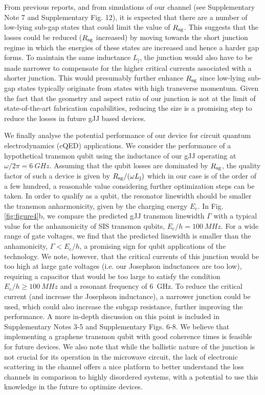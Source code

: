 \documentclass[preprint,
  onecolumn,
  notitlepage,
  amsmath,amssymb,
  aip,
  apl,
]{revtex4-1}
\begin{document}
From previous reports\cite{rosdahl_andreev_2018}, and from simulations of our channel (see Supplementary Note 7 and Supplementary Fig. 12), it is expected that there are a number of low-lying sub-gap states that could limit the value of $R_{\rm sg}$.
This suggests that the losses could be reduced ($R_{\rm sg}$ increased) by moving towards the short junction regime in which the energies of these states are increased and hence a harder gap forms.
To maintain the same inductance $L_\textrm{j}$, the junction would also have to be made narrower to compensate for the higher critical currents associated with a shorter junction.
This would presumably further enhance $R_{\rm sg}$ since low-lying sub-gap states typically originate from states with high transverse momentum.
Given the fact that the geometry and aspect ratio of our junction is not at the limit of state-of-the-art fabrication capabilities, reducing the size is a promising step to reduce the losses in future gJJ based devices.

We finally analyse the potential performance of our device for circuit quantum electrodynamics (cQED) applications.
We consider the performance of a hypothetical transmon qubit \cite{koch_chargeinsensitive_2007} using the inductance of our gJJ operating at $\omega/2\pi=\SI{6}{GHz}$.
Assuming that the qubit losses are dominated by $R_{\rm sg}$, the quality factor of such a device is given by $R_{\rm sg}/(\omega L_\textrm{j})$ which in our case is of the order of a few hundred, a reasonable value considering further optimization steps can be taken.
In order to qualify as a qubit, the resonator linewidth should be smaller the transmon anharmonicity, given by the charging energy $E_\textrm{c}$.
In Fig. \ref{fig:figure4}b, we compare the predicted gJJ transmon linewidth $\Gamma$ with a typical value for the anhamonicity of SIS transmon qubits, $E_\textrm{c}/h = \SI{100}{MHz}$.
For a wide range of gate voltages, we find that the predicted linewidth is smaller than the anhamonicity, $\Gamma < E_\textrm{c}/h$, a promising sign for qubit applications of the technology.
We note, however, that the critical currents of this junction would be too high at large gate voltages (i.e. our Josephson inductances are too low), requiring a capacitor that would be too large to satisfy the condition $E_\textrm{c}/h \geq \SI{100}{MHz}$ and a resonant frequency of \SI{6}{GHz}.
To reduce the critical current (and increase the Josephson inductance), a narrower junction could be used, which could also increase the subgap resistance, further improving the performance.
A more in-depth discussion on this point is included in Supplementary Notes 3-5 and Supplementary Figs. 6-8.
We believe that implementing a graphene transmon qubit with good coherence times is feasible for future devices.
We also note that while the ballistic nature of the junction is not crucial for its operation in the microwave circuit, the lack of electronic scattering in the channel offers a nice platform to better understand the loss channels in comparison to highly disordered systems, with a potential to use this knowledge in the future to optimize devices. 
\end{document}
